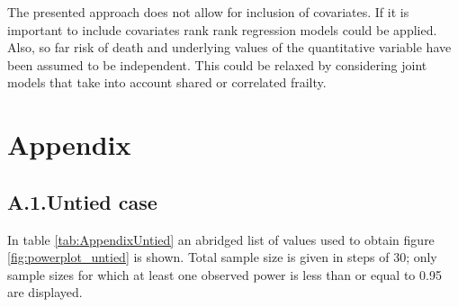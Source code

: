 \documentclass[bimj,fleqn]{w-art}\usepackage[]{graphicx}\usepackage[]{color}
\theoremstyle{plain}
\theoremstyle{definition}
\begin{document}
The presented approach does not allow for inclusion of covariates. If it is
important to include covariates rank rank regression models could be applied.
Also, so far risk of death and underlying values of the quantitative variable
have been assumed to be independent. This could be relaxed by considering joint
models that take into account shared or correlated frailty.

\section*{Appendix}
\subsection*{A.1.\enspace Untied case}
In table \ref{tab:AppendixUntied} an abridged list of values used to obtain
figure \ref{fig:powerplot_untied} is shown. Total sample size is given in steps
of 30; only sample sizes for which at least one observed power is less than or
equal to 0.95 are displayed.
\end{document}
